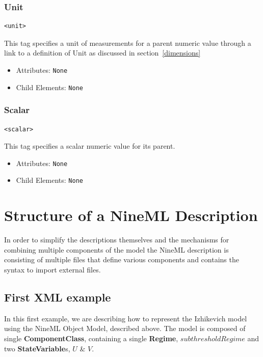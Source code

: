 \documentclass{article}
\newcommand{\ComponentClass}{{\bf{ComponentClass}}\xspace}
\newcommand{\StateVariables}{{\bf{StateVariable}}s\xspace}
\newcommand{\Regime}{{\bf{Regime}}\xspace}
\begin{document}
\subsubsection{Unit}
%
\begin{lstlisting}
<unit>
\end{lstlisting}

This tag specifies a unit of measurements for a parent numeric value
through a link to a definition of Unit as discussed in
section~\ref{dimensions}

\begin{itemize}
\item Attributes: \texttt{None}

\item Child Elements: \texttt{None}

\end{itemize}

\subsubsection{Scalar}
%
\begin{lstlisting}
<scalar>
\end{lstlisting}

This tag specifies a scalar numeric value for its parent.

\begin{itemize}
\item Attributes: \texttt{None}

\item Child Elements: \texttt{None}

\end{itemize}

\newpage

\section{Structure of a NineML Description}

In order to simplify the descriptions themselves and the mechanisms for
combining multiple components of the model the NineML description
is consisting of multiple files that define various components and
contains the syntax to import external files.

\subsection{First XML example}

\noindent
In this first example, we are describing how to represent the Izhikevich model using the NineML Object Model, described above.
The model is composed of single \ComponentClass, containing a single \Regime, $subthresholdRegime$ and two
\StateVariables, $U$ \& $V$.
\end{document}
